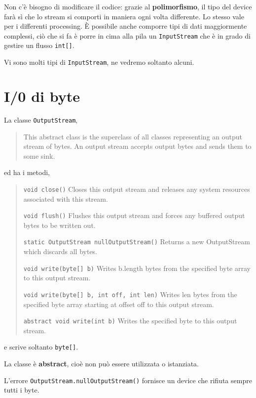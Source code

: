 \documentclass[\fontsizeclass,twocolumn]{\classname}
\theoremstyle{definition}
\theoremstyle{definition}
\begin{document}
Non c'è bisogno di modificare il codice: grazie al \textbf{polimorfismo}, il
tipo del device farà sì che lo stream si comporti in maniera ogni volta
differente. Lo stesso vale per i differenti processing. È possibile anche
comporre tipi di dati maggiormente complessi, ciò che si fa è porre in cima
alla pila un \texttt{Input\-Stream} che è in grado di gestire un flusso
\texttt{int[]}.

Vi sono molti tipi di \texttt{Input\-Stream}, ne vedremo soltanto alcuni.

\section{I/0 di byte}

La classe \texttt{Output\-Stream},

\begin{quote}
    \footnotesize{This abstract class is the superclass of all classes
    representing an output stream of bytes. An output stream accepts output
bytes and sends them to some sink.}
\end{quote}

ed ha i metodi,
\begin{quote}
    \footnotesize{\texttt{void 	close()} 	Closes this output stream and releases any system resources associated with this stream.

            \texttt{void 	flush()} 	Flushes this output stream and forces any buffered output bytes to be written out.

    \texttt{static OutputStream 	nullOutputStream()} 	Returns a new OutputStream which discards all bytes.

    \texttt{void 	write(byte[] b)} 	Writes b.length bytes from the specified byte array to this output stream.

    \texttt{void 	write(byte[] b, int off, int len)} 	Writes len bytes from the specified byte array starting at offset off to this output stream.

\texttt{abstract void 	write(int b)} 	Writes the specified byte to this output stream.}

\end{quote}

e scrive soltanto \texttt{byte[]}.

La classe è \textbf{abstract}, cioè non può essere utilizzata o istanziata.

L'errore \texttt{OutputStream.nullOutputStream()} fornisce un device che
rifiuta sempre tutti i byte.
\end{document}
